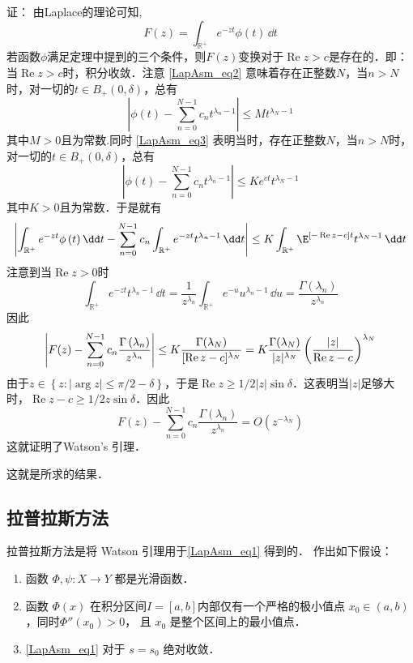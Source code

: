 证：
由Laplace的理论可知, 
\[
F\left(z\right)=\int_{\mathbb{R}^+}{e^{-zt}\phi\left(t\right)}\,\dd t
\]
若函数$\phi$满足定理中提到的三个条件，则$F(z)$变换对于$\operatorname{Re} z>c$是存在的．即：当$\operatorname{Re} z>c$时，积分收敛．注意 \autoref{LapAsm_eq2} 意味着存在正整数$N$，当$n>N$时，对一切的$t\in B_{+}(0,\delta)$，总有
\[
  \left|\phi\left(t\right)-\sum_{n=0}^{N-1}{c_nt^{\lambda_n-1}}\right|\le Mt^{\lambda_N-1}
\]
其中$M>0$且为常数.同时 \autoref{LapAsm_eq3} 表明当时，存在正整数$N$，当$n>N$时，对一切的$t\in B_{+}(0,\delta)$，总有
\[
\left|\phi\left(t\right)-\sum_{n=0}^{N-1}{c_nt^{\lambda_n-1}}\right|\le Ke^{ct}t^{\lambda_N-1}
\]
其中$K>0$且为常数．于是就有
\[
\left|\int_{\mathbb{R}^+}{e^{-zt}\phi\left(t\right)}\,\dd t-\sum_{n=0}^{N-1}{c_n\int_{\mathbb{R}^+}{e^{-zt}t^{\lambda_n-1}}\,\dd t}\right|
\le K\int_{\mathbb{R}^+}\E^{[-\operatorname{Re}z-c]t}t^{\lambda_N-1}\,\dd t
\]
注意到当$\operatorname{Re}z>0$时
\[
\int_{\mathbb{R}^+}{e^{-zt}t^{\lambda_n-1}}\,\dd t
=\frac{1}{z^{\lambda_n}}\int_{\mathbb{R}^+}{e^{-u}u^{\lambda_n-1}}\,\dd u
=\frac{\Gamma\left(\lambda_n\right)}{z^{\lambda_n}}
\]
因此
\[
\left|F(z)-\sum_{n=0}^{N-1}{c_n\frac{\Gamma\left(\lambda_n\right)}{z^{\lambda_n}}}\right|\le K {\Gamma(\lambda_{N})\over \operatorname{[Re}z-c]^{\lambda_N}}
=K{\Gamma(\lambda_{N})\over |z|^{\lambda_N}}\left(|z|\over \operatorname{Re}z-c\right)^{\lambda_N}
\]
由于$z\in{\left\{z:\left|\arg{z}\right|\le\pi/2-\delta\right\}}$，于是$\operatorname{Re} z\geq 1/2|z|\sin \delta$．这表明当$\left|z\right|$足够大时，$\operatorname{Re}z-c\geqslant1/2 z\sin \delta$．因此
\[
F\left(z\right)-\sum_{n=0}^{N-1}{c_n\frac{\Gamma\left(\lambda_n\right)}{z^{\lambda_n}}}=O\left(z^{-\lambda_N}\right)
\]
这就证明了Watson's 引理．

这就是所求的结果．

\subsection{拉普拉斯方法}
拉普拉斯方法是将 Watson 引理用于\autoref{LapAsm_eq1} 得到的． 作出如下假设：

\begin{enumerate}
\item 函数 $\Phi,\psi:X\to Y$ 都是光滑函数．

\item 函数 $\Phi(x)$ 在积分区间$I=[a,b]$内部仅有一个严格的极小值点 $x_0\in(a,b)$，同时$\Phi''(x_0)>0$， 且 $x_0$ 是整个区间上的最小值点．

\item \autoref{LapAsm_eq1} 对于 $s=s_0$ 绝对收敛．
\end{enumerate}

